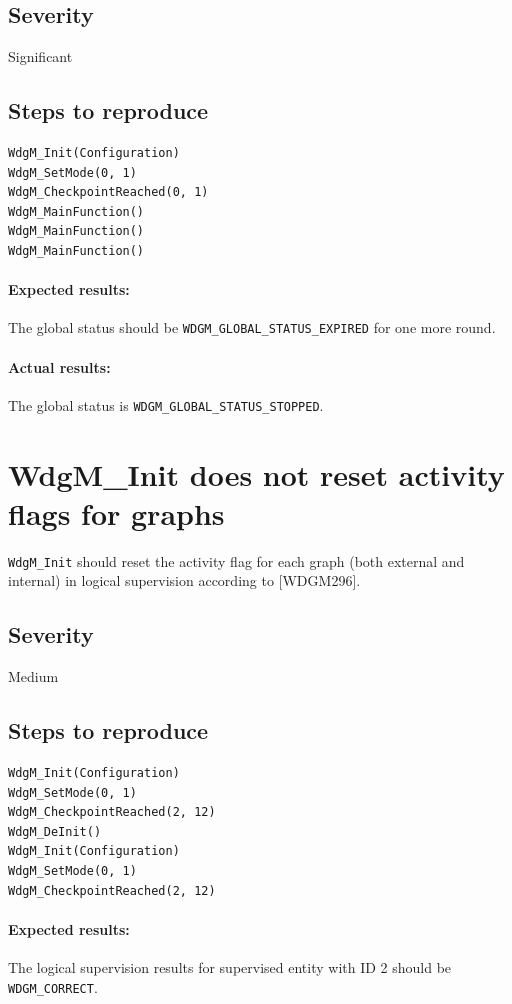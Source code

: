 \subsection{Severity}
Significant

\subsection{Steps to reproduce}
\begin{lstlisting}
WdgM_Init(Configuration)
WdgM_SetMode(0, 1)
WdgM_CheckpointReached(0, 1)
WdgM_MainFunction()
WdgM_MainFunction()
WdgM_MainFunction()
\end{lstlisting}
\paragraph{Expected results:}
The global status should be \lstinline!WDGM_GLOBAL_STATUS_EXPIRED! for one more round.
\paragraph{Actual results:}
The global status is \lstinline!WDGM_GLOBAL_STATUS_STOPPED!.

\section{WdgM\_Init does not reset activity flags for graphs}
\lstinline!WdgM_Init! should reset the activity flag for each graph (both
external and internal) in logical supervision according to [WDGM296].

\subsection{Severity}
Medium

\subsection{Steps to reproduce}
\begin{lstlisting}
WdgM_Init(Configuration)
WdgM_SetMode(0, 1)
WdgM_CheckpointReached(2, 12)
WdgM_DeInit()
WdgM_Init(Configuration)
WdgM_SetMode(0, 1)
WdgM_CheckpointReached(2, 12)
\end{lstlisting}
\paragraph{Expected results:}
The logical supervision results for supervised entity with ID 2 should
be \lstinline!WDGM_CORRECT!.
